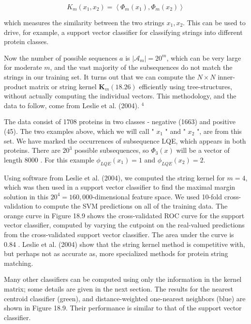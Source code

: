 \documentclass[10pt]{article}
\begin{document}
\begin{equation*}
K_{m}\left(x_{1}, x_{2}\right)=\left\langle\Phi_{m}\left(x_{1}\right), \Phi_{m}\left(x_{2}\right)\right\rangle \tag{18.26}
\end{equation*}


which measures the similarity between the two strings $x_{1}, x_{2}$. This can be used to drive, for example, a support vector classifier for classifying strings into different protein classes.

Now the number of possible sequences $a$ is $\left|\mathcal{A}_{m}\right|=20^{m}$, which can be very large for moderate $m$, and the vast majority of the subsequences do not match the strings in our training set. It turns out that we can compute the $N \times N$ inner-product matrix or string kernel $\mathbf{K}_{m}(18.26)$ efficiently using tree-structures, without actually computing the individual vectors. This methodology, and the data to follow, come from Leslie et al. (2004). ${ }^{4}$

The data consist of 1708 proteins in two classes - negative (1663) and positive (45). The two examples above, which we will call " $x_{1}$ " and " $x_{2}$ ", are from this set. We have marked the occurrences of subsequence LQE, which appears in both proteins. There are $20^{3}$ possible subsequences, so $\Phi_{3}(x)$ will be a vector of length 8000 . For this example $\phi_{L Q E}\left(x_{1}\right)=1$ and $\phi_{L Q E}\left(x_{2}\right)=2$.

Using software from Leslie et al. (2004), we computed the string kernel for $m=4$, which was then used in a support vector classifier to find the maximal margin solution in this $20^{4}=160,000$-dimensional feature space. We used 10-fold cross-validation to compute the SVM predictions on all of the training data. The orange curve in Figure 18.9 shows the cross-validated ROC curve for the support vector classifier, computed by varying the cutpoint on the real-valued predictions from the cross-validated support vector classifier. The area under the curve is 0.84 . Leslie et al. (2004) show that the string kernel method is competitive with, but perhaps not as accurate as, more specialized methods for protein string matching.

Many other classifiers can be computed using only the information in the kernel matrix; some details are given in the next section. The results for the nearest centroid classifier (green), and distance-weighted one-nearest neighbors (blue) are shown in Figure 18.9. Their performance is similar to that of the support vector classifier.
\end{document}

